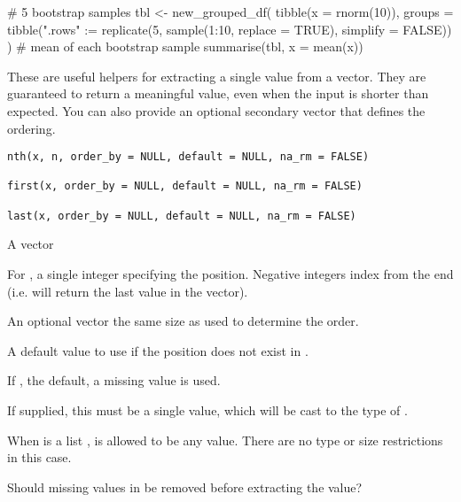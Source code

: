 \documentclass[a4paper]{book}
\begin{document}
%
\begin{Examples}
\begin{ExampleCode}
# 5 bootstrap samples
tbl <- new_grouped_df(
  tibble(x = rnorm(10)),
  groups = tibble(".rows" := replicate(5, sample(1:10, replace = TRUE), simplify = FALSE))
)
# mean of each bootstrap sample
summarise(tbl, x = mean(x))

\end{ExampleCode}
\end{Examples}
%
\begin{Description}
These are useful helpers for extracting a single value from a vector. They
are guaranteed to return a meaningful value, even when the input is shorter
than expected. You can also provide an optional secondary vector that defines
the ordering.
\end{Description}
%
\begin{Usage}
\begin{verbatim}
nth(x, n, order_by = NULL, default = NULL, na_rm = FALSE)

first(x, order_by = NULL, default = NULL, na_rm = FALSE)

last(x, order_by = NULL, default = NULL, na_rm = FALSE)
\end{verbatim}
\end{Usage}
%
\begin{Arguments}
\begin{ldescription}
\item[\code{x}] A vector

\item[\code{n}] For , a single integer specifying the position.
Negative integers index from the end (i.e.  will return the
last value in the vector).

\item[\code{order\_by}] An optional vector the same size as  used to determine the
order.

\item[\code{default}] A default value to use if the position does not exist in .

If , the default, a missing value is used.

If supplied, this must be a single value, which will be cast to the type of
.

When  is a list ,  is allowed to be any value. There are no
type or size restrictions in this case.

\item[\code{na\_rm}] Should missing values in  be removed before extracting the
value?
\end{ldescription}
\end{Arguments}
\end{document}
